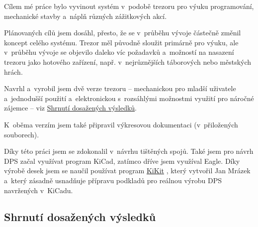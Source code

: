 Cílem mé práce bylo vyvinout systém v~podobě trezoru pro výuku programování, mechanické stavby a~náplň různých zážitkových akcí. 

Plánovaných cílů jsem dosáhl, přesto, že se v~průběhu vývoje částečně změnil koncept celého systému. Trezor měl původně sloužit primárně pro výuku, ale v~průběhu vývoje 
se objevilo daleko víc požadavků a~možností na nasazení trezoru jako hotového zařízení, např. v~nejrůznějších táborových nebo městských hrách. 

Navrhl a~vyrobil jsem dvě verze trezoru -- mechanickou pro mladší uživatele
a~jednodušší použití a~elektronickou s~rozsáhlými možnostmi využití pro 
náročné zájemce -- viz \hyperref[shrnuti_vysledky]{Shrnutí dosažených výsledků}.

K~oběma verzím jsem také připravil výkresovou dokumentaci (v~přilo\-že\-ných souborech).


Díky této práci jsem se zdokonalil v~návrhu tištěných spojů. Také jsem pro návrh DPS začal využívat program KiCad, zatímco dříve jsem využíval Eagle.
Díky výrobě desek jsem se naučil používat program \href{https://github.com/yaqwsx/KiKit}{KiKit} \parencite{KiKit}, 
který vytvořil Jan Mrázek a~který zásadně usnadňuje přípravu podkladů pro reálnou výrobu DPS navržených v~KiCadu.

\subsection*{Shrnutí dosažených výsledků} \label{shrnuti_vysledky}

